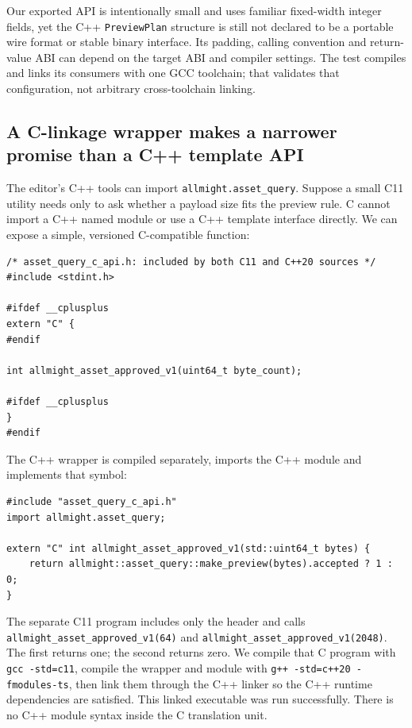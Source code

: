 Our exported API is intentionally small and uses familiar fixed-width integer fields, yet the C++ \texttt{PreviewPlan} structure is still not declared to be a portable wire format or stable binary interface. Its padding, calling convention and return-value ABI can depend on the target ABI and compiler settings. The test compiles and links its consumers with one GCC toolchain; that validates that configuration, not arbitrary cross-toolchain linking.

\subsection{A C-linkage wrapper makes a narrower promise than a C++ template API}\label{05-engine-i-ch006-a-c-linkage-wrapper-makes-a-narrower-promise-than-a-c-template-api}

The editor's C++ tools can import \texttt{allmight.asset\_query}. Suppose a small C11 utility needs only to ask whether a payload size fits the preview rule. C cannot import a C++ named module or use a C++ template interface directly. We can expose a simple, versioned C-compatible function:

\begin{verbatim}
/* asset_query_c_api.h: included by both C11 and C++20 sources */
#include <stdint.h>

#ifdef __cplusplus
extern "C" {
#endif

int allmight_asset_approved_v1(uint64_t byte_count);

#ifdef __cplusplus
}
#endif
\end{verbatim}

The C++ wrapper is compiled separately, imports the C++ module and implements that symbol:

\begin{verbatim}
#include "asset_query_c_api.h"
import allmight.asset_query;

extern "C" int allmight_asset_approved_v1(std::uint64_t bytes) {
    return allmight::asset_query::make_preview(bytes).accepted ? 1 : 0;
}
\end{verbatim}

The separate C11 program includes only the header and calls \texttt{allmight\_asset\_approved\_v1(64)} and \texttt{allmight\_asset\_approved\_v1(2048)}. The first returns one; the second returns zero. We compile that C program with \texttt{gcc\ -std=c11}, compile the wrapper and module with \texttt{g++\ -std=c++20\ -fmodules-ts}, then link them through the C++ linker so the C++ runtime dependencies are satisfied. This linked executable was run successfully. There is no C++ module syntax inside the C translation unit.

